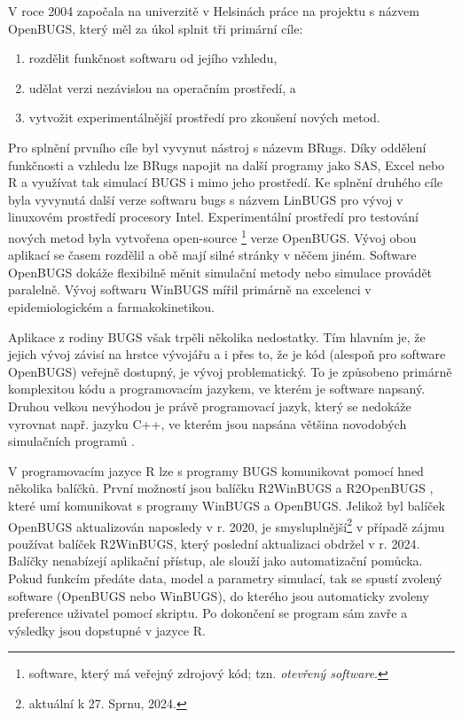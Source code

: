 \documentclass[
  11pt,
  a4paper]{report}
\providecommand{\tightlist}{%
  \setlength{\itemsep}{0pt}\setlength{\parskip}{0pt}}\usepackage{longtable,booktabs,array}
\begin{document}
V roce 2004 započala na univerzitě v Helsinách práce na projektu s
názvem OpenBUGS, který měl za úkol splnit tři primární cíle:

\begin{enumerate}
\def\labelenumi{\arabic{enumi})}
\tightlist
\item
  rozdělit funkčnost softwaru od jejího vzhledu,
\item
  udělat verzi nezávislou na operačním prostředí, a
\item
  vytvožit experimentálnější prostředí pro zkoušení nových metod.
\end{enumerate}

Pro splnění prvního cíle byl vyvynut nástroj s názevm BRugs. Díky
oddělení funkčnosti a vzhledu lze BRugs napojit na další programy jako
SAS, Excel nebo R a využívat tak simulací BUGS i mimo jeho prostředí. Ke
splnění druhého cíle byla vyvynutá další verze softwaru bugs s názvem
LinBUGS pro vývoj v linuxovém prostředí procesory Intel. Experimentální
prostředí pro testování nových metod byla vytvořena open-source
\footnote{software, který má veřejný zdrojový kód; tzn. \emph{otevřený
  software}.} verze OpenBUGS. Vývoj obou aplikací se časem rozdělil a
obě mají silné stránky v něčem jiném. Software OpenBUGS dokáže
flexibilně měnit simulační metody nebo simulace provádět paralelně.
Vývoj softwaru WinBUGS mířil primárně na excelenci v epidemiologickém a
farmakokinetikou.

Aplikace z rodiny BUGS však trpěli několika nedostatky. Tím hlavním je,
že jejich vývoj závisí na hrstce vývojářu a i přes to, že je kód
(alespoň pro software OpenBUGS) veřejně dostupný, je vývoj
problematický. To je způsobeno primárně komplexitou kódu a programovacím
jazykem, ve kterém je software napsaný. Druhou velkou nevýhodou je právě
programovací jazyk, který se nedokáže vyrovnat např. jazyku C++, ve
kterém jsou napsána většina novodobých simulačních programů
\parencite{LunnEtAl2009_BUGSProjectEvolution}.

V programovacím jazyce R lze s programy BUGS komunikovat pomocí hned
několika balíčků. První možností jsou balíčku R2WinBUGS a R2OpenBUGS
\parencite{SturtzEtAl2005_R2WinBUGSPackageRunning}, které umí
komunikovat s programy WinBUGS a OpenBUGS. Jelikož byl balíček OpenBUGS
aktualizován naposledy v r. 2020, je smysluplnější\footnote{aktuální k
  27. Sprnu, 2024.} v případě zájmu používat balíček R2WinBUGS, který
poslední aktualizaci obdržel v r. 2024. Balíčky nenabízejí aplikační
přístup, ale slouží jako automatizační pomůcka. Pokud funkcím předáte
data, model a parametry simulací, tak se spustí zvolený software
(OpenBUGS nebo WinBUGS), do kterého jsou automaticky zvoleny preference
uživatel pomocí skriptu. Po dokončení se program sám zavře a výsledky
jsou dopstupné v jazyce R.
\end{document}
